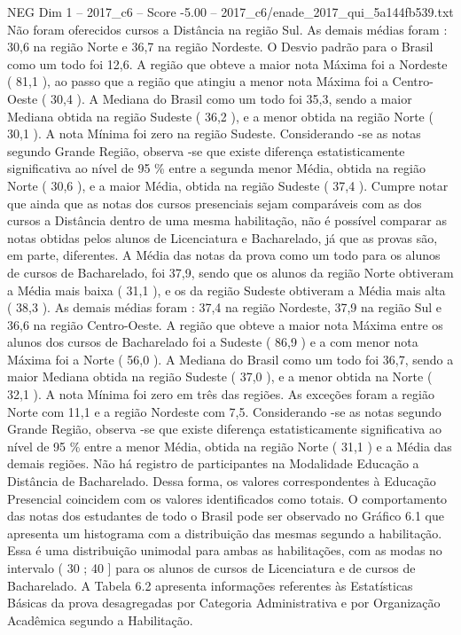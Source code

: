 \begin{textsample}{NEG Dim 1 – 2017\_c6 – Score -5.00 – 2017\_c6/enade\_2017\_qui\_5a144fb539.txt}
Não foram oferecidos cursos a Distância na região Sul.
As demais médias foram : 30,6 na região Norte e 36,7 na região Nordeste.
O Desvio padrão para o Brasil como um todo foi 12,6.
A região que obteve a maior nota Máxima foi a Nordeste ( 81,1 ), ao passo que a região que atingiu a menor nota Máxima foi a Centro-Oeste ( 30,4 ).
A Mediana do Brasil como um todo foi 35,3, sendo a maior Mediana obtida na região Sudeste ( 36,2 ), e a menor obtida na região Norte ( 30,1 ).
A nota Mínima foi zero na região Sudeste.
Considerando -se as notas segundo Grande Região, observa -se que existe diferença estatisticamente significativa ao nível de 95 \% entre a segunda menor Média, obtida na região Norte ( 30,6 ), e a maior Média, obtida na região Sudeste ( 37,4 ).
Cumpre notar que ainda que as notas dos cursos presenciais sejam comparáveis com as dos cursos a Distância dentro de uma mesma habilitação, não é possível comparar as notas obtidas pelos alunos de Licenciatura e Bacharelado, já que as provas são, em parte, diferentes.
A Média das notas da prova como um todo para os alunos de cursos de Bacharelado, foi 37,9, sendo que os alunos da região Norte obtiveram a Média mais baixa ( 31,1 ), e os da região Sudeste obtiveram a Média mais alta ( 38,3 ).
As demais médias foram : 37,4 na região Nordeste, 37,9 na região Sul e 36,6 na região Centro-Oeste.
A região que obteve a maior nota Máxima entre os alunos dos cursos de Bacharelado foi a Sudeste ( 86,9 ) e a com menor nota Máxima foi a Norte ( 56,0 ).
A Mediana do Brasil como um todo foi 36,7, sendo a maior Mediana obtida na região Sudeste ( 37,0 ), e a menor obtida na Norte ( 32,1 ).
A nota Mínima foi zero em três das regiões.
As exceções foram a região Norte com 11,1 e a região Nordeste com 7,5.
Considerando -se as notas segundo Grande Região, observa -se que existe diferença estatisticamente significativa ao nível de 95 \% entre a menor Média, obtida na região Norte ( 31,1 ) e a Média das demais regiões.
Não há registro de participantes na Modalidade Educação a Distância de Bacharelado.
Dessa forma, os valores correspondentes à Educação Presencial coincidem com os valores identificados como totais.
O comportamento das notas dos estudantes de todo o Brasil pode ser observado no Gráfico 6.1 que apresenta um histograma com a distribuição das mesmas segundo a habilitação.
Essa é uma distribuição unimodal para ambas as habilitações, com as modas no intervalo ( 30 ; 40 ] para os alunos de cursos de Licenciatura e de cursos de Bacharelado.
A Tabela 6.2 apresenta informações referentes às Estatísticas Básicas da prova desagregadas por Categoria Administrativa e por Organização Acadêmica segundo a Habilitação.

\end{textsample}
